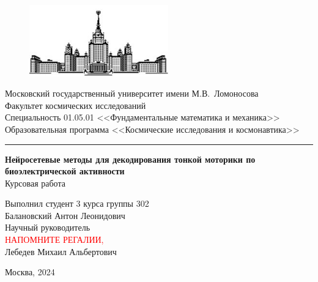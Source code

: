 \documentclass[a4paper,12pt]{article}
\begin{document}
\begin{titlepage}
	
	 \vspace{-0.7 in}
	\begin{center}
		\begin{figure}[h!]
			\centering
			\includegraphics[width = 6cm, height = 4 cm]{msu.jpg}
			\label{fig:msu}
		\end{figure}
		\normalsize{{Московский  государственный
				университет имени М.В.~Ломоносова}}\\[0.1cm]
		\normalsize{{Факультет космических исследований}}\\[0.1 cm]
  \normalsize{{Специальность 01.05.01 <<Фундаментальные математика и механика>>}}\\[0.1 cm]
\normalsize{{ Образовательная программа <<Космические исследования и космонавтика>>}}
		\noindent\rule{16cm}{0.4pt}
		\vfill
	
		\hfill \break
		\textbf{\Large{Нейросетевые методы для декодирования тонкой моторики по биоэлектрической активности}}\\ [0.3cm]
        \normalsize{{Курсовая работа}}\\
		\vfill
		\normalsize
		\begin{flushright}
			Выполнил студент 3 курса группы 302\\
			Балановский Антон Леонидович\\
			
			 
			
			Научный руководитель\\
			\textcolor{red}{НАПОМНИТЕ РЕГАЛИИ,}\\
            Лебедев Михаил Альбертович\\

			
		\end{flushright}
		\hfill \break
	\end{center}
	
	\vfill
	\begin{center}{Москва, 2024}\end{center}
	\thispagestyle{empty} 
\end{titlepage}
\newpage
\end{document}
